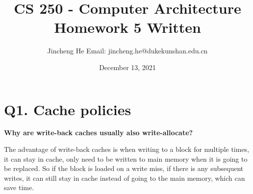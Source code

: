 \documentclass{article}
\title{CS 250 - Computer Architecture \\ Homework 5 Written}
\author{Jincheng He Email: jincheng.he@dukekunshan.edu.cn}
\date{December 13, 2021}
\theoremstyle{remark}
\theoremstyle{definition}
\begin{document}
    \maketitle


    \section{Q1. Cache policies}
    \textbf{Why are write-back caches usually also write-allocate?}

    The advantage of write-back caches is when writing to a block for multiple times, it can stay in cache, only need to be written to main memory when it is going to be replaced.
    So if the block is loaded on a write miss, if there is any subsequent writes, it can still stay in cache instead of going to the main memory, which can save time.
\end{document}
